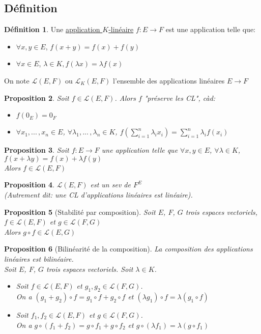 \documentclass[10pt,a4paper]{article}
\theoremstyle{plain}
\newtheorem{proposition}{Proposition}[section]
\theoremstyle{definition}
\newtheorem{definition}[proposition]{Définition}
\begin{document}
\subsection{Définition}
\begin{definition}
Une \uline{application $K$-linéaire} $f: E \to F$ est une application telle que:
\begin{itemize}
\item $\forall x, y \in E$, $f(x + y) = f(x) + f(y)$
\item $\forall x \in E$, $\lambda \in K, f(\lambda x) = \lambda f(x)$
\end{itemize}
On note $\mathcal{L}(E, F)$ ou $\mathcal{L}_K(E, F)$ l'ensemble des applications linéaires $E \to F$
\end{definition}
\begin{proposition}
Soit $f \in \mathcal{L}(E, F)$. Alors $f$ "préserve les CL", càd:
\begin{itemize}
\item $f(0_E) = 0_F$
\item $\forall x_1, ...\, , x_n \in E$, $\forall \lambda_1, ...\, , \lambda_n \in K$, $f(\sum\limits_{i = 1}^{n} \lambda_i x_i ) = \sum\limits_{i = 1}^{n} \lambda_i f(x_i)$
\end{itemize}
\end{proposition}
\begin{proposition}
Soit $f: E \to F$ une application telle que $\forall x, y \in E$, $\forall \lambda \in K$, $f(x + \lambda y) = f(x) + \lambda f(y)$ \\
Alors $f \in \mathcal{L}(E, F)$
\end{proposition}
\begin{proposition}
$\mathcal{L}(E, F)$ est un sev de $F^E$ \\
(Autrement dit: une CL d'applications linéaires est linéaire).
\end{proposition}
\begin{proposition}[Stabilité par composition]
Soit $E$, $F$, $G$ trois espaces vectoriels, $f \in \mathcal{L}(E, F)$ et $g \in \mathcal{L}(F, G)$ \\
Alors $g \circ f \in \mathcal{L}(E, G)$
\end{proposition}
\begin{proposition}[Bilinéarité de la composition]
La composition des applications linéaires est bilinéaire. \\
Soit $E$, $F$, $G$ trois espaces vectoriels. Soit $\lambda \in K$.
\begin{itemize}
\item Soit $f \in \mathcal{L}(E, F)$ et $g_1, g_2 \in \mathcal{L}(F, G)$. \\
On a $(g_1 + g_2) \circ f = g_1 \circ f + g_2 \circ f$ et $(\lambda g_1) \circ f = \lambda (g_1 \circ f)$
\item Soit $f_1, f_2 \in \mathcal{L}(E, F)$ et $g \in \mathcal{L}(F, G)$. \\
On a $g \circ (f_1 + f_2) = g \circ f_1 + g \circ f_2$ et $g \circ (\lambda f_1) = \lambda (g \circ f_1)$
\end{itemize}
\end{proposition}
\end{document}
